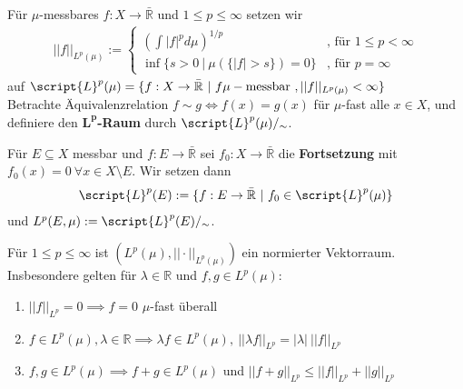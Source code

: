   \begin{definition}[$L^p$-Norm]
    Für $\mu$-messbares $f: X \to \bar{\mathbb{R}}$ und $1 \leq p \leq \infty$ setzen wir
    \begin{align*}
      ||f||_{L^p(\mu)} := \begin{cases}
        (\int |f|^p d\mu)^{1/p} & \text{, für } 1\leq p < \infty\\
        \inf\{s>0 \ | \ \mu(\{|f| > s\})=0\} & \text{, für } p = \infty
      \end{cases}
    \end{align*}
    auf $\script{L}^p(\mu) = \{f:X \to \bar{\mathbb{R}} \ | \ f \mu-\text{messbar }, ||f||_{L^p(\mu)} < \infty\}$\\
    Betrachte Äquivalenzrelation $f\sim g \Leftrightarrow f(x) = g(x)$ für $\mu$-fast alle $x \in X$, und definiere den $\bm{L^p}$\textbf{-Raum} durch $\script{L}^p(\mu)/_{\sim}$.
  \end{definition}

  \begin{definition}
    Für $E \subseteq X$ messbar und $f: E \to \bar{\mathbb{R}}$ sei $f_0: X\to \bar{\mathbb{R}}$ die \textbf{Fortsetzung} mit $f_0(x)=0 \ \forall x \in X \setminus E$. Wir setzen dann
    \begin{align*}
      \script{L}^p(E) := \{f:E \to \bar{\mathbb{R}} \ | \ f_0 \in \script{L}^p(\mu)\}
    \end{align*}
    und $L^p(E,\mu) := \script{L}^p(E)/_{\sim}$.
  \end{definition}

  \begin{proposition}
    Für $1 \leq p \leq \infty$ ist $(L^p(\mu), ||\cdot||_{L^p(\mu)})$ ein normierter Vektorraum. Insbesondere gelten für $\lambda \in \mathbb{R}$ und $f,g \in L^p(\mu)$:
    \begin{enumerate}
      \item $||f||_{L^p} = 0 \implies f = 0$ $\mu$-fast überall
      \item $f \in L^p(\mu), \lambda \in \mathbb{R} \implies \lambda f \in L^p(\mu), \ ||\lambda f||_{L^p} = |\lambda| \ ||f||_{L^p}$
      \item $f,g \in L^p(\mu) \implies f+g \in L^p(\mu)$ und $||f+g||_{L^p} \leq ||f||_{L^p} + ||g||_{L^p}$
    \end{enumerate}
  \end{proposition}

